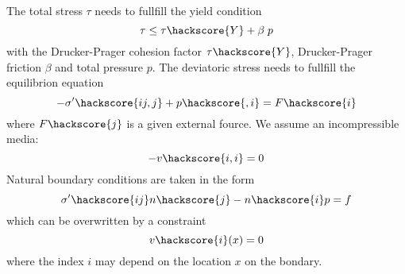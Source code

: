 The total stress $\tau$ needs to fullfill the yield condition  
\begin{equation}\label{IKM-EQU-8c}
\tau \le \tau\hackscore{Y} + \beta \; p
\end{equation}
with the Drucker-Prager  cohesion factor  $\tau\hackscore{Y}$, Drucker-Prager friction $\beta$ and total pressure $p$.
The deviatoric stress needs to fullfill the equilibrion equation
\begin{equation}\label{IKM-EQU-1}
-\sigma'\hackscore{ij,j}+p\hackscore{,i}=F\hackscore{i}
\end{equation}
where $F\hackscore{j}$ is a given external fource. We assume an incompressible media:
\begin{equation}\label{IKM-EQU-2bbb}
-v\hackscore{i,i}=0
\end{equation}
Natural boundary conditions are taken in the form 
\begin{equation}\label{IKM-EQU-Boundary}
\sigma'\hackscore{ij}n\hackscore{j}-n\hackscore{i}p=f
\end{equation}
which can be overwritten by a constraint 
\begin{equation}\label{IKM-EQU-Boundary0}
v\hackscore{i}(x)=0
\end{equation}
where the index $i$ may depend on the location $x$ on the bondary.

